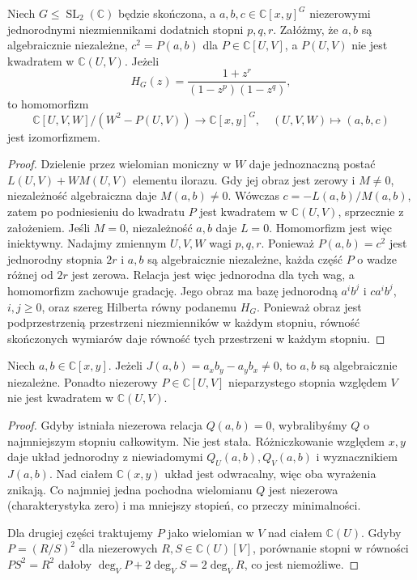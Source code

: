 \begin{lemat}
\label{aa:lem:exceptional-presentation}
Niech $G\le\operatorname{SL}_2(\mathbb C)$ będzie
skończona, a $a,b,c\in\mathbb C[x,y]^G$ niezerowymi
jednorodnymi niezmiennikami dodatnich stopni
$p,q,r$. Załóżmy, że $a,b$ są algebraicznie niezależne,
$c^2=P(a,b)$ dla $P\in\mathbb C[U,V]$,
a $P(U,V)$ nie jest kwadratem w $\mathbb C(U,V)$.
Jeżeli
\[
 H_G(z)=\frac{1+z^r}{(1-z^p)(1-z^q)},
\]
to homomorfizm
\[
 \mathbb C[U,V,W]/(W^2-P(U,V))
 \longrightarrow\mathbb C[x,y]^G,
 \quad (U,V,W)\longmapsto(a,b,c)
\]
jest izomorfizmem.
\end{lemat}
\begin{proof}
Dzielenie przez wielomian moniczny w $W$ daje
jednoznaczną postać $L(U,V)+WM(U,V)$ elementu
ilorazu. Gdy jej obraz jest zerowy i $M\ne0$,
niezależność algebraiczna daje $M(a,b)\ne0$.
Wówczas $c=-L(a,b)/M(a,b)$, zatem po podniesieniu
do kwadratu $P$ jest kwadratem w $\mathbb C(U,V)$,
sprzecznie z założeniem. Jeśli $M=0$, niezależność
$a,b$ daje $L=0$. Homomorfizm jest więc iniektywny.
Nadajmy zmiennym $U,V,W$ wagi $p,q,r$.
Ponieważ $P(a,b)=c^2$ jest jednorodny stopnia $2r$
i $a,b$ są algebraicznie niezależne, każda część
$P$ o wadze różnej od $2r$ jest zerowa.
Relacja jest więc jednorodna dla tych wag,
a homomorfizm zachowuje gradację.
Jego obraz ma bazę jednorodną $a^ib^j$ i $ca^ib^j$,
$i,j\ge0$, oraz szereg Hilberta równy podanemu
$H_G$. Ponieważ obraz jest podprzestrzenią
przestrzeni niezmienników w każdym stopniu,
równość skończonych wymiarów daje równość
tych przestrzeni w każdym stopniu.
\end{proof}

\begin{lemat}
\label{aa:lem:exceptional-jacobian}
Niech $a,b\in\mathbb C[x,y]$.
Jeżeli $J(a,b)=a_xb_y-a_yb_x\ne0$, to $a,b$ są
algebraicznie niezależne. Ponadto niezerowy
$P\in\mathbb C[U,V]$ nieparzystego stopnia względem
$V$ nie jest kwadratem w $\mathbb C(U,V)$.
\end{lemat}
\begin{proof}
Gdyby istniała niezerowa relacja $Q(a,b)=0$,
wybralibyśmy $Q$ o najmniejszym stopniu całkowitym.
Nie jest stała. Różniczkowanie względem $x,y$ daje
układ jednorodny z niewiadomymi
$Q_U(a,b),Q_V(a,b)$ i wyznacznikiem $J(a,b)$.
Nad ciałem $\mathbb C(x,y)$ układ jest odwracalny,
więc oba wyrażenia znikają. Co najmniej jedna
pochodna wielomianu $Q$ jest niezerowa
(charakterystyka zero) i ma mniejszy stopień,
co przeczy minimalności.

Dla drugiej części traktujemy $P$ jako wielomian
w $V$ nad ciałem $\mathbb C(U)$. Gdyby
$P=(R/S)^2$ dla niezerowych $R,S\in\mathbb C(U)[V]$,
porównanie stopni w równości $PS^2=R^2$
dałoby $\deg_V P+2\deg_V S=2\deg_V R$,
co jest niemożliwe.
\end{proof}

